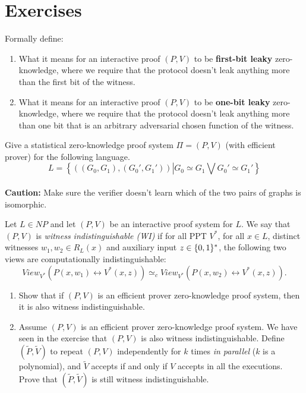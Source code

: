 \section*{Exercises}
\begin{exercise} Formally define:
\begin{enumerate}
  \item 
What it means for an  interactive proof $(P,V)$ to be \textbf{first-bit leaky} zero-knowledge, where we require that the protocol doesn't leak anything more than the first bit of the witness.

\item What it means for an  interactive proof $(P,V)$ to be \textbf{one-bit leaky} zero-knowledge, where we require that the protocol doesn't leak anything more than one bit that is an arbitrary adversarial chosen function of the witness.
    \end{enumerate}
\end{exercise}

\begin{exercise} Give a statistical zero-knowledge proof system $\Pi = (P,V)$ (with efficient prover) for the following language.
    \[ L = \left\{((G_0,G_1),(G_0',G_1'))\left| G_0 \simeq G_1 \bigvee G_0' \simeq G_1'\right.\right\}\]\\
    \textbf{Caution:} Make sure the verifier doesn't learn which of the two pairs of graphs is isomorphic.
\end{exercise}

\begin{exercise} [ZK implies WI] Let $L \in NP$ and let $(P,V)$ be an interactive proof system for $L$. We say that $(P,V)$ is \emph{witness indistinguishable (WI)} if for all PPT $V^*$, for all $x \in L$, distinct witnesses $w_1, w_2 \in R_L(x)$ and  auxiliary input $z\in \{0,1\}^{*}$, the following two views are computationally indistinguishable:
\[View_{V^*} \left(P(x,w_1) \leftrightarrow V^*(x,z) \right) \simeq_c View_{V^*} \left(P(x,w_2) \leftrightarrow V^*(x,z) \right).\]
\begin{enumerate}
\item Show that if $(P,V)$ is an efficient prover zero-knowledge proof system, then it is also witness indistinguishable.

\item Assume $(P,V)$ is an efficient prover zero-knowledge proof system. We have seen in the exercise that $(P,V)$ is also witness indistinguishable. Define $(\tilde P, \tilde V)$ to repeat $(P,V)$ independently for $k$ times \emph{in parallel} ($k$ is a polynomial), and $\tilde V$ accepts if and only if $V$ accepts in all the executions. Prove that $(\tilde P, \tilde V)$ is still witness indistinguishable.
\end{enumerate}    
\end{exercise}

